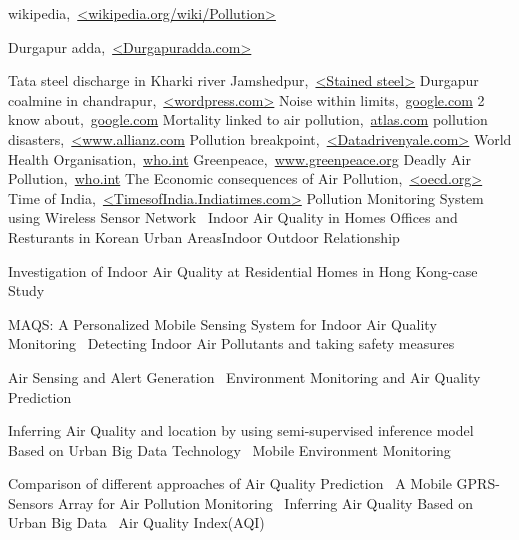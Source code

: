 \cleardoublepage
{}
{}
\begin{thebibliography}{99}

wikipedia,\ \url{<wikipedia.org/wiki/Pollution>}

Durgapur adda,\ \url{<Durgapuradda.com>}

Tata steel discharge in Kharki river Jamshedpur,\ \url{<Stained steel>}
Durgapur coalmine in chandrapur,\ \url{<wordpress.com>}
Noise within limits,\ \url{google.com}
2 know about,\ \url{google.com}
Mortality linked to air pollution,\ \url{atlas.com}
pollution disasters,\ \url{<www.allianz.com}
Pollution breakpoint,\ \url{<Datadrivenyale.com>}
World Health Organisation,\ \url{who.int}
Greenpeace,\ \url{www.greenpeace.org}
Deadly Air Pollution,\ \url{who.int}
The Economic consequences of Air Pollution,\ \url{<oecd.org>}
Time of India,\ \url{<TimesofIndia.Indiatimes.com>}
Pollution Monitoring System using Wireless Sensor Network\ \url{}
Indoor Air Quality in Homes Oﬃces and Resturants in Korean Urban AreasIndoor Outdoor Relationship
\ \url{}

Investigation of Indoor Air Quality at Residential Homes in Hong Kong-case Study\ \url{}

MAQS: A Personalized Mobile Sensing System for Indoor Air Quality Monitoring\ \url{}
Detecting Indoor Air Pollutants and taking safety measures\ \url{}

Air Sensing and Alert Generation\ \url{}
Environment Monitoring and Air Quality Prediction\ \url{}

Inferring Air Quality and location by using semi-supervised inference model Based on Urban Big Data Technology\ \url{}
Mobile Environment Monitoring\ \url{}

Comparison of diﬀerent approaches of Air Quality Prediction\ \url{}
A Mobile GPRS-Sensors Array for Air Pollution Monitoring\ \url{}
Inferring Air Quality Based on Urban Big Data\ \url{}
Air Quality Index(AQI)\ \url{}

\end{thebibliography}
